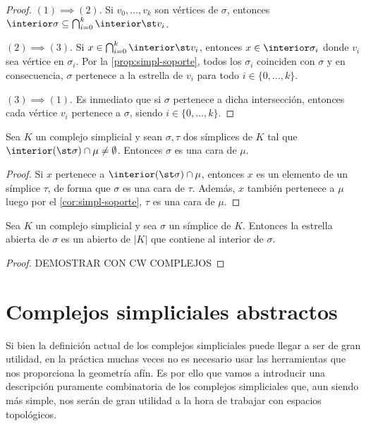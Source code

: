 \begin{proof}
	\((1) \implies (2)\). Si \(v_{0}, \ldots, v_{k}\) son vértices de \(\sigma\), entonces
	\(\interior \sigma \subseteq \bigcap_{i=0}^{k}\interior \st v_{i}\).

	\((2) \implies (3)\). Si \(x \in \bigcap_{i=0}^{k}\interior \st v_{i}\), entonces \(x
	\in \interior \sigma_{i}\) donde \(v_{i}\) sea vértice en \(\sigma_{i}\). Por la
	\autoref{prop:simpl-soporte}, todos los \(\sigma_{i}\) coinciden con \(\sigma\) y en
	consecuencia, \(\sigma\) pertenece a la estrella de \(v_{i}\) para todo
	\(i \in \{0, \ldots, k\}\).

	\((3) \implies (1)\). Es inmediato que si \(\sigma\) pertenece a dicha intersección,
	entonces cada vértice \(v_{i}\) pertenece a \(\sigma\), siendo \(i \in \{0, \ldots, k
	\}\).
\end{proof}
\begin{lema}
	Sea \(K\) un complejo simplicial y sean \(\sigma, \tau\) dos símplices de \(K\) tal que
	\(\interior(\st\sigma) \cap \mu \neq \emptyset\). Entonces \(\sigma\) es una cara
	de \(\mu\).
\end{lema}
\begin{proof}
	Si \(x\) pertenece a \(\interior (\st \sigma) \cap \mu\), entonces \(x\) es un
	elemento de un símplice \(\tau\), de forma que \(\sigma\) es una cara de \(\tau\).
	Además, \(x\) también pertenece a \(\mu\) luego por el \autoref{cor:simpl-soporte},
	\(\tau\) es una cara de \(\mu\).
\end{proof}
\begin{proposicion}
	\label{prop:estr-abierta-abierto-en-K} Sea \(K\) un complejo simplicial y sea \(\sigma\)
	un símplice de \(K\). Entonces la estrella abierta de \(\sigma\) es un abierto de
	\(|K|\) que contiene al interior de \(\sigma\).
\end{proposicion}
\begin{proof}
	DEMOSTRAR CON CW COMPLEJOS
\end{proof}

\section{Complejos simpliciales abstractos}

Si bien la definición actual de los complejos simpliciales puede llegar a ser de
gran utilidad, en la práctica muchas veces no es necesario usar las herramientas
que nos proporciona la geometría afín. Es por ello que vamos a introducir una
descripción puramente combinatoria de los complejos simpliciales que, aun siendo
más simple, nos serán de gran utilidad a la hora de trabajar con espacios
topológicos.

